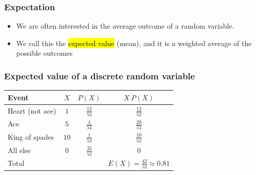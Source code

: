 
\begin{frame}
\frametitle{Expectation}

\begin{itemize}

\item We are often interested in the average outcome of a random variable.

\item We call this the \hl{expected value} (mean), and it is a weighted average of the possible outcomes
\formula{\[\mu = E(X) = \sum_{i = 1}^k x_i ~ P(X = x_i)\]}

\end{itemize}

\end{frame}


\begin{frame}
\frametitle{Expected value of a discrete random variable}


\pause

\begin{center}
\renewcommand{\arraystretch}{1.5}
\begin{tabular}{l | c | c | c }
Event		& $X$ 		& $P(X)$        		& $X ~ P(X)$ \\
\hline
Heart (not ace)	& $1$		& $\frac{12}{52}$	& $\frac{12}{52}$ \\
Ace			& $5$		& $\frac{4}{52}$	& $\frac{20}{52}$ \\	
King of spades	& $10$		& $\frac{1}{52}$	& $\frac{10}{52}$ \\	
All else		& $0$		& $\frac{35}{52}$	& $0$ \\
\hline
Total			&			&				& $E(X) = \frac{42}{52} \approx 0.81$
\end{tabular}

\end{center}

\end{frame}


